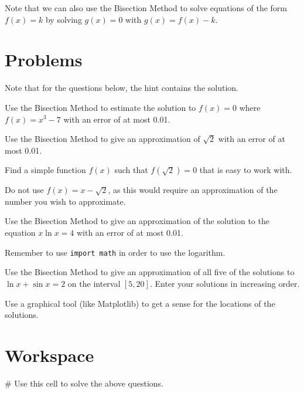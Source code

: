 \documentclass{ximera}
\begin{document}
Note that we can also use the Bisection Method to solve equations of the form $f(x)=k$ by solving $g(x)=0$ with $g(x)=f(x)-k$.

\section{Problems}

Note that for the questions below, the hint contains the solution.

\begin{question}
	Use the Bisection Method to estimate the solution to $f(x)=0$ where $f(x)=x^3-7$ with an error of at most 0.01. 
\end{question}

\begin{question}
	Use the Bisection Method to give an approximation of $\sqrt{2}$ with an error of at most 0.01.
	\begin{hint}
		Find a simple function $f(x)$ such that $f(\sqrt{2})=0$ that is easy to work with.
	\end{hint}
	\begin{hint}
		Do not use $f(x)=x-\sqrt{2}$, as this would require an approximation of the number you wish to approximate.
	\end{hint}
\end{question}

\begin{question}
	Use the Bisection Method to give an approximation of the solution to the equation $x\ln{x}=4$ with an error of at most 0.01.
	\begin{hint}
		Remember to use \verb|import math| in order to use the logarithm.
	\end{hint}
\end{question}

\begin{question}
	Use the Bisection Method to give an approximation of all five of the solutions to $\ln{x}+\sin{x}=2$ on the interval $[5,20]$. Enter your solutions in increasing order.
	\begin{hint}
		Use a graphical tool (like Matplotlib) to get a sense for the locations of the solutions.
	\end{hint}
\end{question}

\section{Workspace}

\begin{sageCell}
# Use this cell to solve the above questions.
\end{sageCell}
\end{document}
